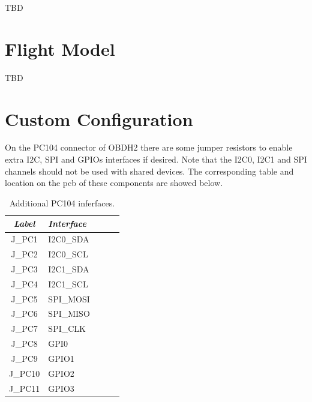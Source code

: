TBD

\section{Flight Model}

TBD

\section{Custom Configuration}

On the PC104 connector of OBDH2 there are some jumper resistors to enable extra I2C, SPI and GPIOs interfaces if desired. Note that the I2C0, I2C1 and SPI channels should not be used with shared devices. The corresponding table and location on the pcb of these components are showed below. 

\begin{table}[!h]
    \centering
    \begin{tabular}{cllll}
        \toprule[1.5pt]
        \textit{Label} & \textit{Interface} \\
        \midrule
        J\_PC1            & I2C0\_SDA \\
        J\_PC2            & I2C0\_SCL \\
        J\_PC3            & I2C1\_SDA \\
        J\_PC4            & I2C1\_SCL \\
        J\_PC5            & SPI\_MOSI \\
        J\_PC6            & SPI\_MISO \\
        J\_PC7            & SPI\_CLK \\
        J\_PC8            & GPI0 \\
        J\_PC9            & GPIO1 \\
        J\_PC10           & GPIO2 \\
        J\_PC11           & GPIO3 \\
        \bottomrule[1.5pt]
    \end{tabular}
    \caption{Additional PC104 inferfaces.}
    \label{tab:additional-pc104-inferfaces}
\end{table}

